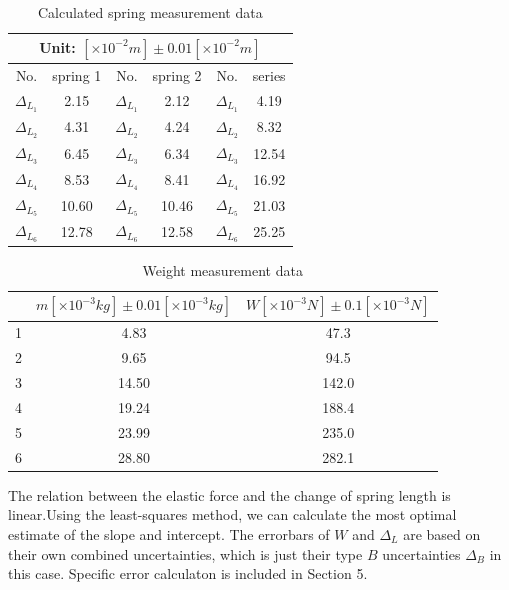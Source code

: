     \begin{table}[htbp]
        \centering
        \begin{tabular}{|c|c|c|c|c|c|}
            \hline
            \multicolumn{6}{|c|}{Unit: $[\times 10^{-2}m]\pm 0.01[\times 10^{-2}m]$}\\ \hline
            No. & spring 1 & No. & spring 2 & No. & series\\ \hline
            $\Delta_{L_1}$ & 2.15 & $\Delta_{L_1}$ & 2.12 & $\Delta_{L_1}$ & 4.19\\ \hline
            $\Delta_{L_2}$ & 4.31 & $\Delta_{L_2}$ & 4.24 & $\Delta_{L_2}$ & 8.32\\ \hline
            $\Delta_{L_3}$ & 6.45 & $\Delta_{L_3}$ & 6.34 & $\Delta_{L_3}$ & 12.54\\ \hline
            $\Delta_{L_4}$ & 8.53 & $\Delta_{L_4}$ & 8.41 & $\Delta_{L_4}$ & 16.92\\ \hline
            $\Delta_{L_5}$ & 10.60 & $\Delta_{L_5}$ & 10.46 & $\Delta_{L_5}$ & 21.03\\ \hline
            $\Delta_{L_6}$ & 12.78 & $\Delta_{L_6}$ & 12.58 & $\Delta_{L_6}$ & 25.25\\ \hline
        \end{tabular}
        \caption{Calculated spring measurement data}\label{spring*}
    \end{table}
    \begin{table}[htbp]
        \centering
        \begin{tabular}{|c|c|c|}
            \hline
            & $m[\times 10^{-3}kg]\pm 0.01[\times 10^{-3}kg]$ & $W[\times 10^{-3}N]\pm 0.1[\times 10^{-3}N]$\\ \hline
            1 & 4.83 & 47.3\\ \hline
            2 & 9.65 & 94.5\\ \hline
            3 & 14.50 & 142.0\\ \hline
            4 & 19.24 & 188.4\\ \hline
            5 & 23.99 & 235.0\\ \hline
            6 & 28.80 & 282.1\\ \hline            
        \end{tabular}
        \caption{Weight measurement data}\label{weight}
    \end{table}
    The relation between the elastic force and the change of spring length is linear.Using the least-squares method, we can calculate the most optimal estimate of the slope and intercept. The errorbars of $W$ and $\Delta_L$ are based on their own combined uncertainties, which is just their type $B$ uncertainties $\Delta_B$ in this case. Specific error calculaton is included in Section 5.

